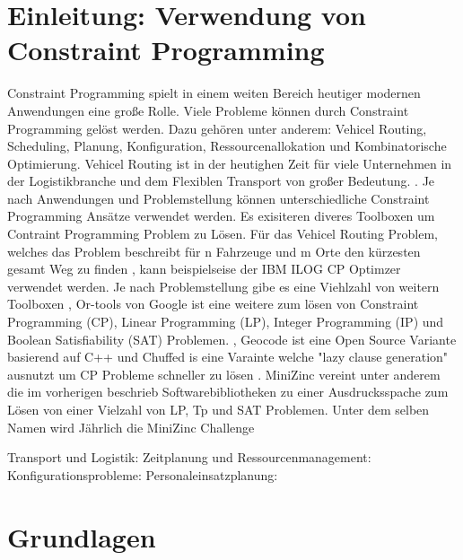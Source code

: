 




\tableofcontents

\clearpage
{}


\section{Einleitung: Verwendung von Constraint Programming}
\label{sec:Einleitung: Verwendung von Constraint Programming}
Constraint Programming spielt in einem weiten Bereich heutiger modernen
Anwendungen eine große Rolle. Viele Probleme können durch Constraint Programming
gelöst werden. Dazu gehören unter anderem: Vehicel Routing, Scheduling, Planung,
Konfiguration, Ressourcenallokation und Kombinatorische Optimierung. Vehicel
Routing ist in der heutighen Zeit für viele Unternehmen in der Logistikbranche
und dem Flexiblen Transport von großer Bedeutung. \cite[1]{delec22jo}. Je nach
Anwendungen und Problemstellung können unterschiedliche Constraint Programming
Ansätze verwendet werden. Es exisiteren diveres Toolboxen um Contraint
Programming Problem zu Lösen. Für das Vehicel Routing Problem, welches das
Problem beschreibt für n Fahrzeuge und m Orte den kürzesten gesamt Weg zu finden
\cite[222]{labor18joa}, kann beispielseise der IBM ILOG CP Optimzer verwendet
werden.\cite{IBMIwe} Je nach Problemstellung gibe es eine Viehlzahl von weitern
Toolboxen \cite{Solviwea}, Or-tools von Google ist eine weitere zum lösen von
Constraint Programming (CP), Linear Programming (LP), Integer Programming (IP)
und Boolean Satisfiability (SAT) Problemen. \cite{ORToowe}, Geocode ist eine
Open Source Variante basierend auf C++ \cite{GECODwe} und Chuffed is eine
Varainte welche "lazy clause generation" ausnutzt um CP Probleme schneller zu
lösen \cite{Chuff24co}. MiniZinc vereint unter anderem die im vorherigen beschrieb
Softwarebibliotheken zu einer Ausdrucksspache zum Lösen von einer Vielzahl von 
LP, Tp und SAT Problemen. \cite{MiniZwe} Unter dem selben Namen wird Jährlich
die MiniZinc Challenge



Transport und Logistik: Zeitplanung und Ressourcenmanagement:
Konfigurationsprobleme: Personaleinsatzplanung:

\cite[1-5]{rossi06bo}

\section{Grundlagen}
